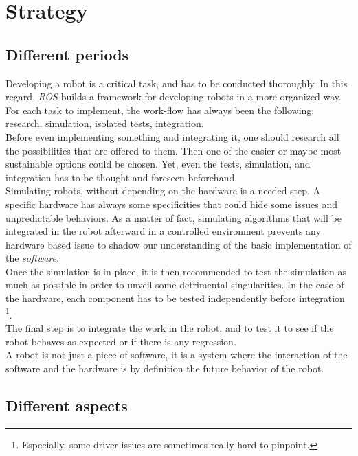 	\section{Strategy}
	
		\subsection{Different periods}

		Developing a robot is a critical task, and has to be conducted thoroughly. 
		In this regard, \textit{ROS} builds a framework for developing 
		robots in a more organized way. For each task to implement, 
		the work-flow has always been the following: research, simulation, isolated 
		tests, integration.
		\\\indent Before even implementing something and integrating it, one should 
		research all the possibilities that are offered to them. Then one of the 
		easier or maybe most sustainable options could be chosen. Yet, even the
		tests, simulation, and integration has to be thought and foreseen beforehand.
		\\\indent Simulating robots, without depending on the hardware is
		a needed step.	 A specific hardware has always some specificities that
		could hide some issues and unpredictable behaviors. As a matter of fact, 
		simulating algorithms that will be integrated in the robot afterward in 
		a controlled environment prevents any hardware based issue to shadow
		our understanding of the basic implementation of
		the \textit{software}.
		\\\indent Once the simulation is in place, it is then 
		recommended to test the simulation as much as possible in order
		to unveil some detrimental singularities. In the case of the hardware, 
		each component has to be tested independently before integration
		\footnote{Especially, some driver issues are sometimes really 
		hard to pinpoint.}.
		\\\indent The final step is to integrate the work in the robot, and
		to test it to see if the robot behaves as expected or if there 
		is any regression.
		\\\indent A robot is not just a piece of software, it is a system 
		where the interaction of the software and the hardware is by 
		definition the future behavior of the robot.
		
		\subsection{Different aspects}

